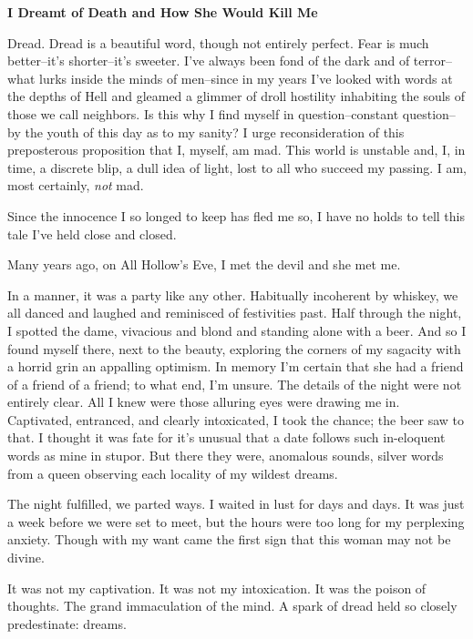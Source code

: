 \documentclass{article}
\begin{document}


\begin{center}
\large\textbf{I Dreamt of Death and How She Would Kill Me}
\end{center}


\noindent
Dread.
Dread is a beautiful word, though not entirely perfect.
Fear is much better--it's shorter--it's sweeter.
I've always been fond of the dark and of terror--what
lurks inside the minds of men--since in my years
I've looked with words at the depths of Hell
and gleamed a glimmer of droll hostility
inhabiting the souls of those we call neighbors.
Is this why I find myself in question--constant question--by
the youth of this day as to my sanity?
I urge reconsideration of this preposterous proposition that
I, myself, am mad.
This world is unstable and, I, in time, a discrete blip,
a dull idea of light, lost to all who succeed my passing.
I am, most certainly, \textit{not} mad.
\VV


\noindent
Since the innocence I so longed to keep has fled me so,
I have no holds to tell this tale I've held close and closed.
\VV


\noindent
Many years ago, on All Hollow's Eve,
I met the devil and she met me.
\VV


\noindent
In a manner, it was a party like any other.
Habitually incoherent by whiskey,
we all danced and laughed and reminisced of festivities past.
Half through the night, I spotted the dame,
vivacious and blond and standing alone with a beer.
And so I found myself there, next to the beauty,
exploring the corners of my sagacity with a horrid
grin an appalling optimism.
In memory I'm certain that she had a friend of
a friend of a friend; to what end, I'm unsure.
The details of the night were not entirely clear.
All I knew were those alluring eyes were drawing me in.
Captivated, entranced, and clearly intoxicated,
I took the chance; the beer saw to that.
I thought it was fate for it's unusual
that a date follows such in-eloquent words
as mine in stupor.
But there they were, anomalous sounds,
silver words from a queen observing each
locality of my wildest dreams.


The night fulfilled, we parted ways.
I waited in lust for days and days.
It was just a week before we were set to meet,
but the hours were too long for my perplexing anxiety.
Though with my want came the first sign that this woman may not be divine.


It was not my captivation.
It was not my intoxication.
It was the poison of thoughts.
The grand immaculation of the mind.
A spark of dread held so closely predestinate: dreams.
\VV
\end{document}
